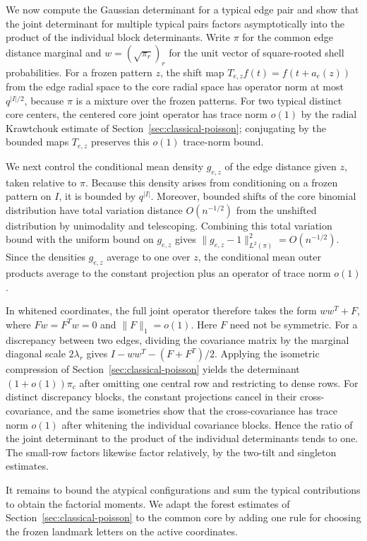 We now compute the Gaussian determinant for a typical edge pair and show that the joint determinant for multiple typical pairs factors asymptotically into the product of the individual block determinants. Write \(\pi\) for the common edge distance marginal and \(w=(\sqrt{\pi_r})_r\) for the unit vector of square-rooted shell probabilities. For a frozen pattern \(z\), the shift map \(T_{e,z}f(t)=f(t+a_e(z))\) from the edge radial space to the core radial space has operator norm at most \(q^{|I|/2}\), because \(\pi\) is a mixture over the frozen patterns. For two typical distinct core centers, the centered core joint operator has trace norm \(o(1)\) by the radial Krawtchouk estimate of Section~\ref{sec:classical-poisson}; conjugating by the bounded maps \(T_{e,z}\) preserves this \(o(1)\) trace-norm bound.

We next control the conditional mean density \(g_{e,z}\) of the edge distance given \(z\), taken relative to \(\pi\). Because this density arises from conditioning on a frozen pattern on \(I\), it is bounded by \(q^{|I|}\). Moreover, bounded shifts of the core binomial distribution have total variation distance \(O(n^{-1/2})\) from the unshifted distribution by unimodality and telescoping. Combining this total variation bound with the uniform bound on \(g_{e,z}\) gives \(\|g_{e,z}-1\|_{L^2(\pi)}^2=O(n^{-1/2})\). Since the densities \(g_{e,z}\) average to one over \(z\), the conditional mean outer products average to the constant projection plus an operator of trace norm \(o(1)\).

In whitened coordinates, the full joint operator therefore takes the form \(ww^T+F\), where \(Fw=F^Tw=0\) and \(\|F\|_1=o(1)\). Here \(F\) need not be symmetric. For a discrepancy between two edges, dividing the covariance matrix by the marginal diagonal scale \(2\lambda_r\) gives \(I-ww^T-(F+F^T)/2\). Applying the isometric compression of Section~\ref{sec:classical-poisson} yields the determinant \((1+o(1))\pi_c\) after omitting one central row and restricting to dense rows. For distinct discrepancy blocks, the constant projections cancel in their cross-covariance, and the same isometries show that the cross-covariance has trace norm \(o(1)\) after whitening the individual covariance blocks. Hence the ratio of the joint determinant to the product of the individual determinants tends to one. The small-row factors likewise factor relatively, by the two-tilt and singleton estimates.

It remains to bound the atypical configurations and sum the typical contributions to obtain the factorial moments. We adapt the forest estimates of Section~\ref{sec:classical-poisson} to the common core by adding one rule for choosing the frozen landmark letters on the active coordinates.

